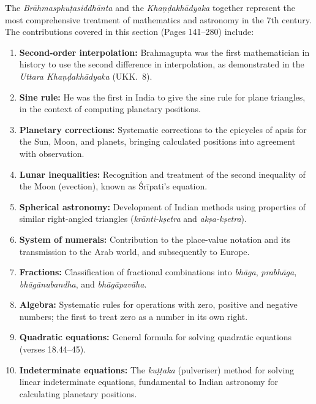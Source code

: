 \documentclass[11pt,a4paper]{article}
\begin{document}
\textbf{T}he \textit{Brāhmasphuṭasiddhānta} and the \textit{Khaṇḍakhādyaka} together represent the most comprehensive treatment of mathematics and astronomy in the 7th century. The contributions covered in this section (Pages 141--280) include:

\begin{enumerate}[label=\textbf{\arabic*.}]
\item \textbf{Second-order interpolation:} Brahmagupta was the first mathematician in history to use the second difference in interpolation, as demonstrated in the \textit{Uttara Khaṇḍakhādyaka} (UKK.\ 8).

\item \textbf{Sine rule:} He was the first in India to give the sine rule for plane triangles, in the context of computing planetary positions.

\item \textbf{Planetary corrections:} Systematic corrections to the epicycles of apsis for the Sun, Moon, and planets, bringing calculated positions into agreement with observation.

\item \textbf{Lunar inequalities:} Recognition and treatment of the second inequality of the Moon (evection), known as Śrīpati's equation.

\item \textbf{Spherical astronomy:} Development of Indian methods using properties of similar right-angled triangles (\textit{krānti-kṣetra} and \textit{akṣa-kṣetra}).

\item \textbf{System of numerals:} Contribution to the place-value notation and its transmission to the Arab world, and subsequently to Europe.

\item \textbf{Fractions:} Classification of fractional combinations into \textit{bhāga}, \textit{prabhāga}, \textit{bhāgānubandha}, and \textit{bhāgāpavāha}.

\item \textbf{Algebra:} Systematic rules for operations with zero, positive and negative numbers; the first to treat zero as a number in its own right.

\item \textbf{Quadratic equations:} General formula for solving quadratic equations (verses 18.44--45).

\item \textbf{Indeterminate equations:} The \textit{kuṭṭaka} (pulveriser) method for solving linear indeterminate equations, fundamental to Indian astronomy for calculating planetary positions.
\end{enumerate}
\end{document}
